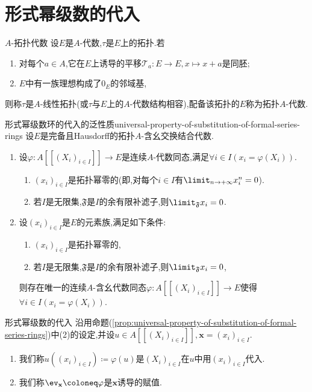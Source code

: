 \section{形式幂级数的代入}

\begin{definition}{$A$-拓扑代数}{}
	设$E$是$A$-代数,$\tau$是$E$上的拓扑.若
	\begin{enumerate}
		\item 对每个$a\in A$,它在$E$上诱导的平移$\mathcal{T}_{a}:E\to E,x\mapsto x+a$是同胚;
		\item $E$中有一族理想构成了$0_{E}$的邻域基,
	\end{enumerate}
	则称$\tau$是$A$-线性拓扑(或$\tau$与$E$上的$A$-代数结构相容),配备该拓扑的$E$称为拓扑$A$-代数.
\end{definition}

\begin{proposition}{形式幂级数环的代入的泛性质}{universal-property-of-substitution-of-formal-series-rings}
	设$E$是完备且Hausdorff的拓扑$A$-含幺交换结合代数.
	\begin{enumerate}
		\item 设$\varphi:A[[(X_{i})_{i\in I}]]\to E$是连续$A$-代数同态,满足$\forall i\in I\left(x_{i}=\varphi\left(X_{i}\right)\right)$.
		\begin{enumerate}
			\item $\left(x_{i}\right)_{i\in I}$是拓扑幂零的(即,对每个$i\in I$有$\limit_{n\to+\infty}x_{i}^{n}=0$).
			\item 若$I$是无限集,$\mathfrak{F}$是$I$的余有限补滤子,则$\limit_{\mathfrak{F}}x_{i}=0$.
		\end{enumerate}
		\item 设$\left(x_{i}\right)_{i\in I}$是$E$的元素族,满足如下条件:
		\begin{enumerate}
			\item $\left(x_{i}\right)_{i\in I}$是拓扑幂零的,
			\item 若$I$是无限集,$\mathfrak{F}$是$I$的余有限补滤子,则$\limit_{\mathfrak{F}}x_{i}=0$,
		\end{enumerate}
		则存在唯一的连续$A$-含幺代数同态$\varphi:A[[(X_{i})_{i\in I}]]\to E$使得$\forall i\in I\left(x_{i}=\varphi\left(X_{i}\right)\right)$.
	\end{enumerate}
\end{proposition}

\begin{definition}{形式幂级数的代入}{}
	沿用命题(\cref{prop:universal-property-of-substitution-of-formal-series-rings})中(2)的设定,并设$u\in A[[(X_{i})_{i\in I}]],\mathbf{x}=\left(x_{i}\right)_{i\in I}$.
	\begin{enumerate}
		\item 我们称$u\left(\left(x_{i}\right)_{i\in I}\right)\coloneq\varphi\left(u\right)$是$\left(X_{i}\right)_{i\in I}$在$u$中用$\left(x_{i}\right)_{i\in I}$代入.
		\item 我们称$\ev_{\mathbf{x}}\coloneq\varphi$是$\mathbf{x}$诱导的赋值.
	\end{enumerate}
\end{definition}

